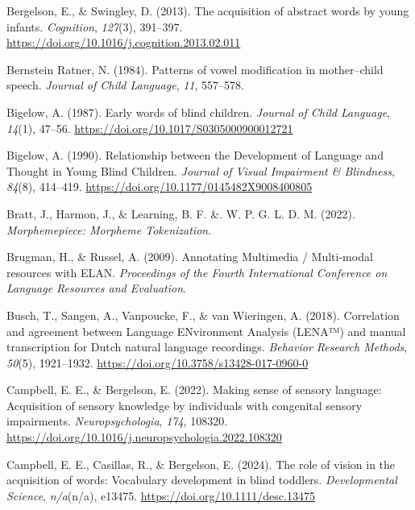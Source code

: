 \documentclass[
  man,floatsintext]{apa6}
\newlength{\cslhangindent}
\newlength{\cslentryspacingunit} %
\newenvironment{CSLReferences}[2] %
 {%
  \setlength{\parindent}{0pt}
  \ifodd #1
  \let\oldpar\par
  \def\par{\hangindent=\cslhangindent\oldpar}
  \fi
  \setlength{\parskip}{#2\cslentryspacingunit}
 }%
 {}
\begin{document}
\begin{CSLReferences}{1}{0}
\leavevmode{}%
Bergelson, E., \& Swingley, D. (2013). The acquisition of abstract words by young infants. \emph{Cognition}, \emph{127}(3), 391--397. \url{https://doi.org/10.1016/j.cognition.2013.02.011}

\leavevmode{}%
Bernstein Ratner, N. (1984). Patterns of vowel modification in mother--child speech. \emph{Journal of Child Language}, \emph{11}, 557--578.

\leavevmode{}%
Bigelow, A. (1987). Early words of blind children. \emph{Journal of Child Language}, \emph{14}(1), 47--56. \url{https://doi.org/10.1017/S0305000900012721}

\leavevmode{}%
Bigelow, A. (1990). Relationship between the {Development} of {Language} and {Thought} in {Young Blind Children}. \emph{Journal of Visual Impairment \& Blindness}, \emph{84}(8), 414--419. \url{https://doi.org/10.1177/0145482X9008400805}

\leavevmode{}%
Bratt, J., Harmon, J., \& Learning, B. F. \&. W. P. G. L. D. M. (2022). \emph{Morphemepiece: {Morpheme Tokenization}}.

\leavevmode{}%
Brugman, H., \& Russel, A. (2009). Annotating {Multimedia} / {Multi-modal} resources with {ELAN}. \emph{Proceedings of the Fourth International Conference on Language Resources and Evaluation}.

\leavevmode{}%
Busch, T., Sangen, A., Vanpoucke, F., \& van Wieringen, A. (2018). Correlation and agreement between {Language ENvironment Analysis} ({LENA}™) and manual transcription for {Dutch} natural language recordings. \emph{Behavior Research Methods}, \emph{50}(5), 1921--1932. \url{https://doi.org/10.3758/s13428-017-0960-0}

\leavevmode{}%
Campbell, E. E., \& Bergelson, E. (2022). Making sense of sensory language: {Acquisition} of sensory knowledge by individuals with congenital sensory impairments. \emph{Neuropsychologia}, \emph{174}, 108320. \url{https://doi.org/10.1016/j.neuropsychologia.2022.108320}

\leavevmode{}%
Campbell, E. E., Casillas, R., \& Bergelson, E. (2024). The role of vision in the acquisition of words: {Vocabulary} development in blind toddlers. \emph{Developmental Science}, \emph{n/a}(n/a), e13475. \url{https://doi.org/10.1111/desc.13475}


\end{CSLReferences}
\end{document}
